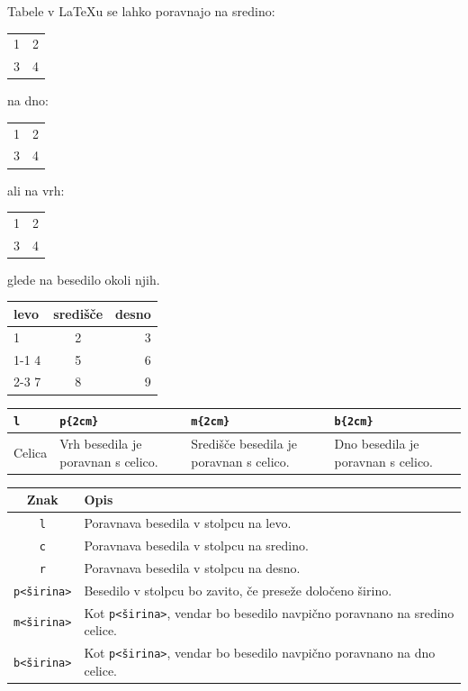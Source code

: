 \documentclass{article}
\begin{document}
\vspace{2cm}

Tabele v \LaTeX u se lahko poravnajo na sredino:
\begin{tabular}{ll} 1&2\\3&4 \end{tabular}
na dno: 
\begin{tabular}[b]{ll} 1&2\\3&4 \end{tabular}
ali na vrh: 
\begin{tabular}[t]{ll} 1&2\\3&4 \end{tabular}
glede na besedilo okoli njih.

\vspace{2cm}
\begin{tabular}{l|c r|}
  levo& središče & desno \\ \hline
  1 & 2 & 3 \\ \cline{1-1}
  4 & 5 & 6 \\ \cline{2-3}
  7 & 8 & 9 \\ \hline
\end{tabular}


\vspace{2cm}

\begin{tabular}{ l p{2cm} m{2cm} b{2cm}}
  \hline
  \texttt{l} & \texttt{p\{2cm\}} & \texttt{m\{2cm\}} & \texttt{b\{2cm\}} \\
  \hline
  Celica &
  Vrh besedila je poravnan s celico. &
  Središče besedila je poravnan s celico. &
  Dno besedila je poravnan s celico. \\\hline
\end{tabular}

\vspace{2cm}

\begin{tabular}{c p{}}
  \toprule
  Znak & Opis \\
  \midrule
  \texttt{l} & Poravnava besedila v stolpcu na levo. \\
  \texttt{c} & Poravnava besedila v stolpcu na sredino. \\
  \texttt{r} & Poravnava besedila v stolpcu na desno. \\
  \texttt{p{<širina>}} & Besedilo v stolpcu bo zavito, če preseže določeno širino. \\
  \texttt{m{<širina>}} & Kot \texttt{p{<širina>}}, vendar bo besedilo navpično poravnano na sredino celice. \\
  \texttt{b{<širina>}} & Kot \texttt{p{<širina>}}, vendar bo besedilo navpično poravnano na dno celice. \\
  \bottomrule
  \end{tabular}
\end{document}
